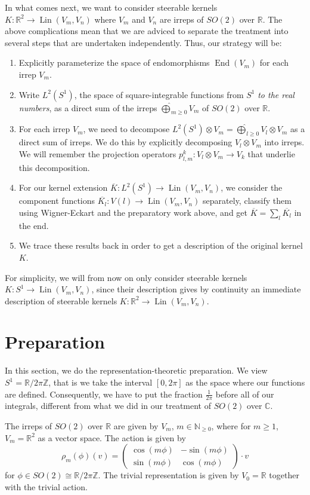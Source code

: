 \documentclass[12pt, a4paper]{article}
\theoremstyle{plain}
\theoremstyle{definition}
\theoremstyle{remark}
\newcommand{\N}{\mathds{N}}
\newcommand{\Z}{\mathds{Z}}
\newcommand{\R}{\mathds{R}}
\newcommand{\C}{\mathds{C}}
\DeclareMathOperator{\lin}{Lin}
\DeclareMathOperator{\End}{End}
\begin{document}
In what comes next, we want to consider steerable kernels $K: \R^2 \to \lin(V_m, V_n)$ where $V_m$ and $V_n$ are irreps of $SO(2)$ over $\R$. The above complications mean that we are adviced to separate the treatment into several steps that are undertaken independently. Thus, our strategy will be:

\begin{enumerate}
\item Explicitly parameterize the space of endomorphisms $\End(V_m)$ for each irrep $V_m$.
\item Write $L^2(S^1)$, the space of square-integrable functions from $S^1$ \emph{to the real numbers}, as a direct sum of the irreps $\widehat{\bigoplus}_{m \geq 0} V_m$ of $SO(2)$ over $\R$.
\item For each irrep $V_m$, we need to decompose $L^2(S^1) \otimes V_m = \widehat{\bigoplus}_{l \geq 0} V_{l} \otimes V_m$ as a direct sum of irreps. We do this by explicitly decomposing $V_{l} \otimes V_m$ into irreps. We will remember the projection operators $p_{l,m}^k: V_{l} \otimes V_m \to V_k$ that underlie this decomposition.
\item For our kernel extension $\overline{K}: L^2(S^1) \to \lin(V_m, V_n)$, we consider the component functions $\overline{K_l}: V(l) \to \lin(V_m, V_n)$ separately, classify them using Wigner-Eckart and the preparatory work above, and get $\overline{K} = \sum_{l}\overline{K_l}$ in the end.
\item We trace these results back in order to get a description of the original kernel $K$.
\end{enumerate}

For simplicity, we will from now on only consider steerable kernels $K: S^1 \to \lin(V_m, V_n)$, since their description gives by continuity an immediate description of steerable kernels $K: \R^2 \to \lin(V_m, V_n)$.

\section{Preparation}

In this section, we do the representation-theoretic preparation. We view $S^1 = \R/{2 \pi \Z}$, that is we take the interval $[0, 2 \pi]$ as the space where our functions are defined. Consequently, we have to put the fraction $\frac{1}{2 \pi}$ before all of our integrals, different from what we did in our treatment of $SO(2)$ over $\C$.

The irreps of $SO(2)$ over $\R$ are given by $V_m$, $m \in \N_{\geq 0}$, where for $m \geq 1$, $V_m = \R^2$ as a vector space. The action is given by
\begin{equation*}
\rho_m(\phi)(v) =
\begin{pmatrix}
\cos(m \phi) & -\sin(m \phi) \\
\sin(m \phi) & \cos(m \phi)
\end{pmatrix} \cdot v
\end{equation*}
for $\phi \in SO(2) \cong \R/{2 \pi \Z}$. The trivial representation is given by $V_0 = \R$ together with the trivial action.
\end{document}
